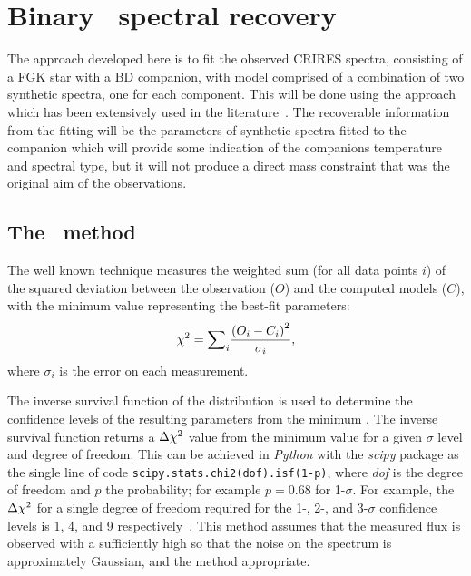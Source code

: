 

\section{Binary \texorpdfstring{\textchisquared}\ \ spectral recovery}
\label{subsec:companion_recovery}
The approach developed here is to fit the observed CRIRES spectra, consisting of a FGK star with a {BD} companion, with model comprised of a combination of two synthetic spectra, one for each component.
This will be done using the \textchisquared{} approach which has been extensively used in the literature~\citep[e.g.][to list a few]{astudillo-defru_harps_2015, passegger_fundamental_2016, zechmeister_spectrum_2018, nemravova_xtauri_2016, kolbl_detection_2015}.
The recoverable information from the fitting will be the parameters of synthetic spectra fitted to the companion which will provide some indication of the companions temperature and spectral type, but it will not produce a direct mass constraint that was the original aim of the observations.

\subsection{The \texorpdfstring{\textchisquared}\ \ method}
\label{subsec:chi2}

The well known \textchisquared{} technique measures the weighted sum (for all data points \(i\)) of the squared deviation between the observation (\({O}\)) and the computed models (\({C}\)), with the minimum \textchisquared{} value representing the best-fit parameters:
\[{\chi}^{2} = {\sum}_i \frac{{(O_{i} - {C}_{i})}^2}{{\sigma}_{i}},\] where \({\sigma}_{i}\) is the error on each measurement.

The inverse survival function of the \textchisquared{} distribution is used to determine the confidence levels of the resulting parameters from the minimum \textchisquared{}.
The inverse survival function returns a \(\Delta{\chi}^{2}\) value from the minimum \textchisquared{} value for a given $\sigma$ level and degree of freedom.
This can be achieved in \emph{Python} with the \emph{scipy} package as the single line of code \texttt{scipy.stats.chi2{(dof)}.isf{(1-p)}}, where \textit{dof} is the degree of freedom and \(p\) the probability; for example \(p = 0.68\) for 1-\(\sigma\).
For example, the \(\Delta {\chi}^{2}\) for a single degree of freedom required for the 1-, 2-, and 3-\(\sigma\) confidence levels is 1, 4, and 9 respectively~\citep{bevington_data_2003}.
This method assumes that the measured flux is observed with a \snr{} sufficiently high so that the noise on the spectrum is approximately Gaussian, and the \textchisquared{} method appropriate.

